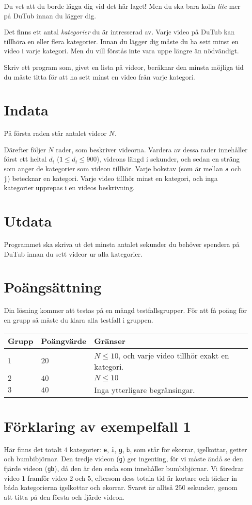 Du vet att du borde lägga dig vid det här laget! Men du ska bara kolla {\em lite} mer på DuTub innan du lägger dig.

Det finns ett antal {\em kategorier} du är intresserad av. Varje
video på DuTub kan tillhöra en eller flera kategorier. Innan du lägger
dig måste du ha sett minst en video i varje kategori. Men du vill
förstås inte vara uppe längre än nödvändigt.

Skriv ett program som, givet en lista på videor, beräknar den minsta möjliga tid du måste titta för att ha sett minst en video från varje kategori.

\section*{Indata}
På första raden står antalet videor $N$.

Därefter följer $N$ rader, som beskriver videorna.
Vardera av dessa rader innehåller först ett heltal $d_i$ ($1 \le d_i \le 900$), videons längd i sekunder, och sedan en sträng som anger de kategorier som videon tillhör.
Varje bokstav (som är mellan \texttt a och \texttt j) betecknar en kategori.
Varje video tillhör minst en kategori, och inga kategorier upprepas i en videos beskrivning.

\section*{Utdata}
Programmet ska skriva ut det minsta antalet sekunder du behöver spendera på DuTub innan du sett videor ur alla kategorier.

\section*{Poängsättning}
Din lösning kommer att testas på en mängd testfallsgrupper.
För att få poäng för en grupp så måste du klara alla testfall i gruppen.

\noindent
\begin{tabular}{| l | l | p{12cm} |}
  \hline
  Grupp & Poängvärde & Gränser \\ \hline
  $1$    & $20$        & $N \le 10$, och varje video tillhör exakt en kategori. \\ \hline 
  $2$    & $40$        & $N \le 10$ \\ \hline
  $3$    & $40$        & Inga ytterligare begränsingar. \\ \hline 
\end{tabular}

\section*{Förklaring av exempelfall 1}
Här finns det totalt $4$ kategorier: \texttt e, \texttt i, \texttt g, \texttt b, som står för ekorrar, igelkottar, getter och bumbibjörnar.
Den tredje videon (\texttt{g}) ger ingenting, för vi måste ändå se den fjärde videon (\texttt{gb}), då den är den enda som innehåller bumbibjörnar.
Vi föredrar video $1$ framför video $2$ och $5$, eftersom dess totala tid är kortare och täcker in båda kategorierna igelkottar och ekorrar.
Svaret är alltså $250$ sekunder, genom att titta på den första och fjärde videon.

